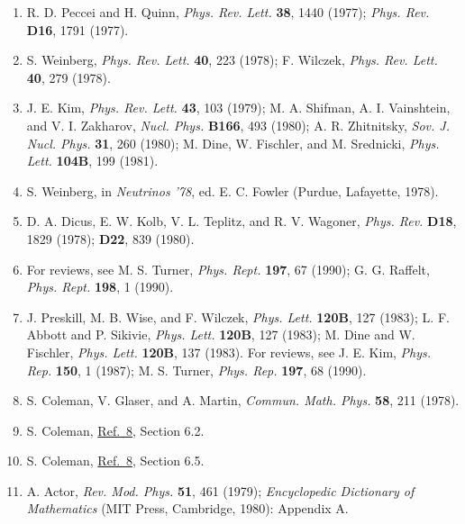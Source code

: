 \begin{enumerate}
\item {}\label{ch23-ref-30}
R. D. Peccei and H. Quinn, \emph{Phys. Rev. Lett.} \textbf{38}, 1440
(1977); \emph{Phys. Rev.} \textbf{D16}, 1791 (1977).

\item {}\label{ch23-ref-31}
S. Weinberg, \emph{Phys. Rev. Lett.} \textbf{40}, 223 (1978);
F. Wilczek, \emph{Phys. Rev. Lett.} \textbf{40}, 279 (1978).

\item {}\label{ch23-ref-32}
J. E. Kim, \emph{Phys. Rev. Lett.} \textbf{43}, 103 (1979);
M. A. Shifman, A. I. Vainshtein, and V. I. Zakharov,
\emph{Nucl. Phys.} \textbf{B166}, 493 (1980); A. R. Zhitnitsky,
\emph{Sov. J. Nucl. Phys.} \textbf{31}, 260 (1980); M. Dine,
W. Fischler, and M. Srednicki, \emph{Phys. Lett.} \textbf{104B}, 199
(1981).

\item {}\label{ch23-ref-33}
S. Weinberg, in \emph{Neutrinos '78}, ed. E. C. Fowler (Purdue,
Lafayette, 1978).

\item {}\label{ch23-ref-34}
D. A. Dicus, E. W. Kolb, V. L. Teplitz, and R. V. Wagoner,
\emph{Phys. Rev.} \textbf{D18}, 1829 (1978); \textbf{D22}, 839 (1980).

\item {}\label{ch23-ref-35}
For reviews, see M. S. Turner, \emph{Phys. Rept.} \textbf{197}, 67
(1990); G. G. Raffelt, \emph{Phys. Rept.} \textbf{198}, 1 (1990).

\item {}\label{ch23-ref-36}
J. Preskill, M. B. Wise, and F. Wilczek, \emph{Phys. Lett.}
\textbf{120B}, 127 (1983); L. F. Abbott and P. Sikivie,
\emph{Phys. Lett.} \textbf{120B}, 127 (1983); M. Dine and W. Fischler,
\emph{Phys. Lett.} \textbf{120B}, 137 (1983). For reviews, see J. E. Kim,
\emph{Phys. Rep.} \textbf{150}, 1 (1987); M. S. Turner,
\emph{Phys. Rep.} \textbf{197}, 68 (1990).

\item {}\label{ch23-ref-37}
S. Coleman, V. Glaser, and A. Martin, \emph{Commun. Math. Phys.}
\textbf{58}, 211 (1978).

\item {}\label{ch23-ref-38}
S. Coleman, \hyperref[ch23-ref-8]{Ref.~8}, Section 6.2.

\item {}\label{ch23-ref-39}
S. Coleman, \hyperref[ch23-ref-8]{Ref.~8}, Section 6.5.

\item {}\label{ch23-ref-40}
A. Actor, \emph{Rev. Mod. Phys.} \textbf{51}, 461 (1979);
\emph{Encyclopedic Dictionary of Mathematics} (MIT Press, Cambridge,
1980): Appendix A.
\end{enumerate}
